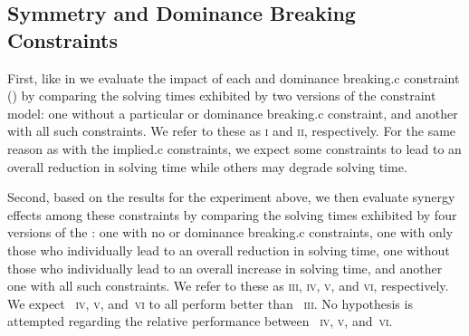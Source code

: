 \subsection{Symmetry and Dominance Breaking Constraints}

\def\modelA{\textsc{i}}
\def\modelB{\textsc{ii}}

First, like in  we evaluate
the impact of each  and \gls{dominance breaking.c}
\gls{constraint}
() by comparing the solving times exhibited by two versions of the
\gls{constraint model}: one without a particular 
or \gls{dominance breaking.c} \gls{constraint}, and another with all such
\glspl{constraint}.
%
We refer to these  as \modelA{} and \modelB,
respectively.
%
For the same reason as with the \gls{implied.c} \glspl{constraint}, we expect
some \glspl{constraint} to lead to an overall reduction in solving time while
others may degrade solving time.

\def\modelC{\textsc{iii}}
\def\modelD{\textsc{iv}}
\def\modelE{\textsc{v}}
\def\modelF{\textsc{vi}}

Second, based on the results for the experiment above, we then evaluate synergy
effects among these \glspl{constraint} by comparing the solving times exhibited
by four versions of the : one with no
 or \gls{dominance breaking.c} \glspl{constraint},
one with only those who individually lead to an overall reduction in solving
time, one without those who individually lead to an overall increase in solving
time, and another one with all such \glspl{constraint}.
%
We refer to these  as \modelC, \modelD, \modelE,
and \modelF, respectively.
%
We expect ~\modelD, \modelE, and~\modelF{} to all
perform better than ~\modelC.
%
No hypothesis is attempted regarding the relative performance between
~\modelD, \modelE, and~\modelF.


